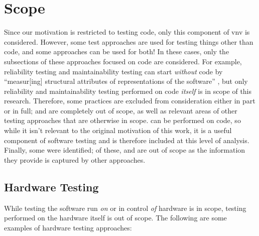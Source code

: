 \section{Scope}
\label{scope}

Since our motivation is restricted to testing code, only this component of
\acf{vnv} is considered. However, some test approaches
are used for testing things other than code, and some approaches can be used
for both! In these cases, only the subsections of these approaches focused on
code are considered. For example, reliability testing and maintainability
testing can start \emph{without} code by ``measur[ing] structural attributes
of representations of the software'' \citep[p.~18]{FentonAndPfleeger1997}, but
only reliability and maintainability testing performed on code \emph{itself} is
in scope of this research. Therefore, some practices are excluded from
consideration either in part or in full;  and 
are completely out of scope, as well as relevant areas of other testing
approaches that are otherwise in scope.  can be performed
on code, so while it isn't relevant to the original motivation of this work, it
is a useful component of software testing and is therefore included at this level
of analysis. \ifnotpaper Finally, some  were identified;
    of these,  and  are out of
    scope as the information they provide is captured by other approaches. \fi

\subsection{Hardware Testing}
\label{hard-test}
While testing the software run \emph{on} or in control \emph{of} hardware is in
scope, testing performed on the hardware itself is out of scope. The following
are some examples of hardware testing approaches:

